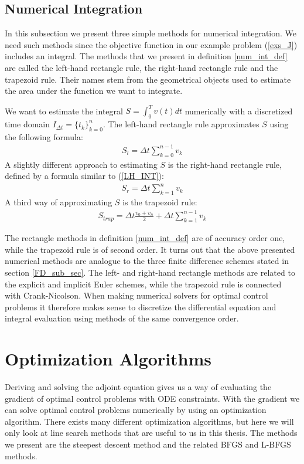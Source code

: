 \subsection{Numerical Integration} \label{num_int_sub_sec}
In this subsection we present three simple methods for numerical integration. We need such methods since the objective function in our example problem (\ref{exs_J}) includes an integral. The methods that we present in definition \ref{num_int_def} are called the left-hand rectangle rule, the right-hand rectangle rule and the trapezoid rule. Their names stem from the geometrical objects used to estimate the area under the function we want to integrate.
\begin{definition} \label{num_int_def}
We want to estimate the integral $S=\int_0^T v(t) dt$ numerically with a discretized time domain $I_{\Delta t}=\{t_k\}_{k=0}^{n}$. The left-hand rectangle rule approximates $S$ using the following formula:
\begin{align}
S_l = \Delta t\sum_{k=0}^{n-1} v_k \label{LH_INT}
\end{align}
A slightly different approach to estimating $S$ is the right-hand rectangle rule, defined by a formula similar to (\ref{LH_INT}): 
\begin{align}
S_r = \Delta t\sum_{k=1}^{n} v_k \label{RH_INT}
\end{align}
A third way of approximating $S$ is the trapezoid rule:
\begin{align}
S_{trap} = \Delta t\frac{v_0+v_n}{2}+\Delta t\sum_{k=1}^{n-1} v_k \label{TRAP_INT}
\end{align}
\end{definition}
\noindent
The rectangle methods in definition \ref{num_int_def} are of accuracy order one, while the trapezoid rule is of second order. It turns out that the above presented numerical methods are analogue to the three finite difference schemes stated in section \ref{FD_sub_sec}. The left- and right-hand rectangle methods are related to the explicit and implicit Euler schemes, while the trapezoid rule is connected with Crank-Nicolson. When making numerical solvers for optimal control problems it therefore makes sense to discretize the differential equation and integral evaluation using methods of the same convergence order. 
\section{Optimization Algorithms} \label{optiSec}
Deriving and solving the adjoint equation gives us a way of evaluating the gradient of optimal control problems with ODE constraints. With the gradient we can solve optimal control problems numerically by using an optimization algorithm. There exists many different optimization algorithms, but here we will only look at line search methods that are useful to us in this thesis. The methods we present are the steepest descent method and the related BFGS and L-BFGS methods.  
